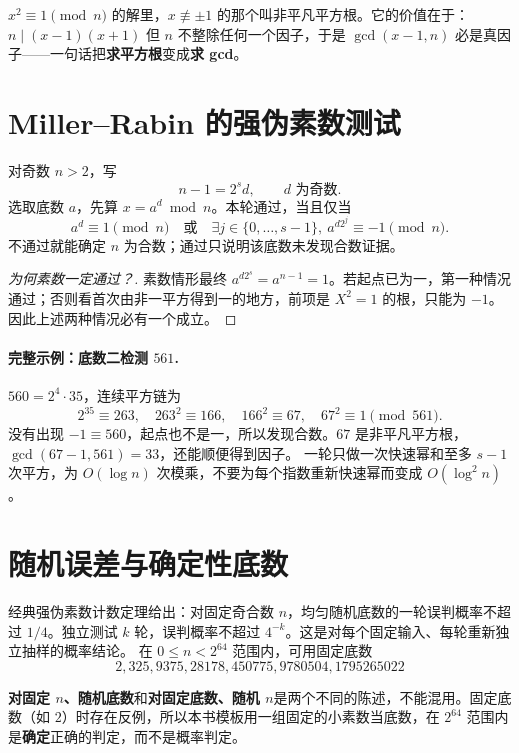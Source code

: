 \begin{tip}[词义：非平凡平方根]
$x^2\equiv1\pmod n$ 的解里，$x\not\equiv\pm1$ 的那个叫非平凡平方根。它的价值在于：$n\mid(x-1)(x+1)$ 但 $n$ 不整除任何一个因子，于是 $\gcd(x-1,n)$ 必是真因子——一句话把\textbf{求平方根}变成\textbf{求 gcd}。
\end{tip}



\section{Miller--Rabin 的强伪素数测试}
对奇数 $n>2$，写
\[
 n-1=2^s d,\qquad d\text{ 为奇数}.
\]
选取底数 $a$，先算 $x=a^d\bmod n$。本轮通过，当且仅当
\[
 a^d\equiv1\pmod n
 \quad\text{或}\quad
 \exists j\in\{0,\ldots,s-1\},\ a^{d2^j}\equiv-1\pmod n.
\]
不通过就能确定 $n$ 为合数；通过只说明该底数未发现合数证据。


\begin{proof}[为何素数一定通过？]
素数情形最终 $a^{d2^s}=a^{n-1}=1$。若起点已为一，第一种情况通过；否则看首次由非一平方得到一的地方，前项是 $X^2=1$ 的根，只能为 $-1$。因此上述两种情况必有一个成立。
\end{proof}
\paragraph{完整示例：底数二检测 $561$.}
$560=2^4\cdot35$，连续平方链为
\[
 2^{35}\equiv263,\quad263^2\equiv166,\quad166^2\equiv67,\quad67^2\equiv1\pmod{561}.
\]
没有出现 $-1\equiv560$，起点也不是一，所以发现合数。$67$ 是非平凡平方根，$\gcd(67-1,561)=33$，还能顺便得到因子。
\cost 一轮只做一次快速幂和至多 $s-1$ 次平方，为 $O(\log n)$ 次模乘，不要为每个指数重新快速幂而变成 $O(\log^2n)$。


\section{随机误差与确定性底数}
经典强伪素数计数定理给出：对固定奇合数 $n$，均匀随机底数的一轮误判概率不超过 $1/4$。独立测试 $k$ 轮，误判概率不超过 $4^{-k}$。这是对每个固定输入、每轮重新独立抽样的概率结论。
在 $0\le n<2^{64}$ 范围内，可用固定底数
\[
 2,325,9375,28178,450775,9780504,1795265022
\]

\begin{tip}[口径：随机的是底数还是模数]
\textbf{对固定 $n$、随机底数}和\textbf{对固定底数、随机 $n$}是两个不同的陈述，不能混用。固定底数（如 $2$）时存在反例，所以本书模板用一组固定的小素数当底数，在 $2^{64}$ 范围内是\textbf{确定}正确的判定，而不是概率判定。
\end{tip}

